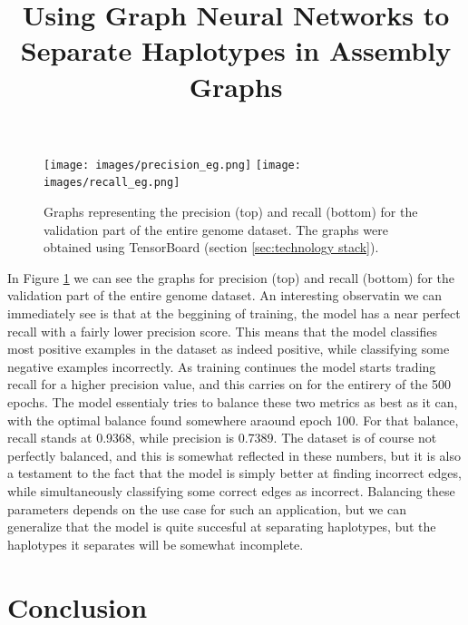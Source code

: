\documentclass[times, utf8, diplomski, english]{fer_eng}
\begin{document}
\begin{figure}[h]
	\centering
	\texttt{[image: images/precision\_eg.png]}
	\texttt{[image: images/recall\_eg.png]}
	\caption[Precision and recall graph]{Graphs representing the precision (top) and recall (bottom) for the validation part of the entire genome dataset. The graphs were obtained using TensorBoard (section \ref{sec:technology stack}).}
	\label{fig:precision and recall}
\end{figure}

In Figure \ref{fig:precision and recall} we can see the graphs for precision (top) and recall (bottom) for the validation part of the entire genome dataset. An interesting observatin we can immediately see is that at the beggining of training, the model has a near perfect recall with a fairly lower precision score. This means that the model classifies most positive examples in the dataset as indeed positive, while classifying some negative examples incorrectly. As training continues the model starts trading recall for a higher precision value, and this carries on for the entirery of the 500 epochs. The model essentialy tries to balance these two metrics as best as it can, with the optimal balance found somewhere araound epoch 100. For that balance, recall stands at 0.9368, while precision is 0.7389. The dataset is of course not perfectly balanced, and this is somewhat reflected in these numbers, but it is also a testament to the fact that the model is simply better at finding incorrect edges, while simultaneously classifying some correct edges as incorrect. Balancing these parameters depends on the use case for such an application, but we can generalize that the model is quite succesful at separating haplotypes, but the haplotypes it separates will be somewhat incomplete.

\chapter{Conclusion}





\clearpage

\title{Using Graph Neural Networks to Separate Haplotypes in Assembly Graphs}
\begin{abstract}

\end{abstract}

\begin{sazetak}

\end{sazetak}
\end{document}
